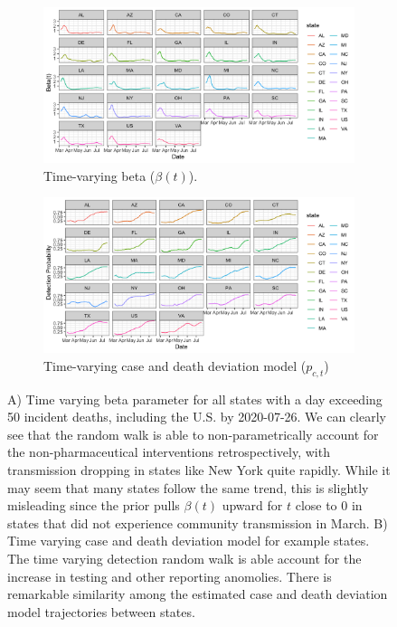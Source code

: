 \documentclass[11pt]{amsart}
\begin{document}
\begin{figure}
  \centering
     \begin{subfigure}{1\textwidth}
  \centering
    \includegraphics[scale=.2]{beta_t_plot.png}
    \caption{Time-varying beta ($\beta(t)$).}
\end{subfigure}

\begin{subfigure}{1\textwidth}
  \centering
    \includegraphics[scale=.2]{detection_plot.png}
    \caption{Time-varying case and death deviation model ($p_{c,t}$)}
\end{subfigure} 
 \caption{  A) Time varying beta parameter for all states with a day exceeding 50 incident deaths, including the U.S. by 2020-07-26. We can clearly see that the random walk is able to non-parametrically account for the non-pharmaceutical interventions retrospectively, with transmission dropping in states like New York quite rapidly. While it may seem that many states follow the same trend, this is slightly misleading since the prior pulls $\beta(t)$ upward for $t$ close to 0 in states that did not experience community transmission in March.  B) Time varying case and death deviation model for example states. The time varying detection random walk is able account for the increase in testing and other reporting anomolies. There is remarkable similarity among the estimated case and death deviation model trajectories between states.}
\label{fig:model_details}
\end{figure}
\end{document}
